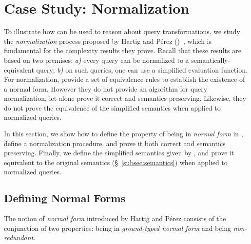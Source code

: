 \section{Case Study: Normalization}\label{sec:norm}

To illustrate how \gcoql can be used to reason about query transformations, we study the {\em normalization} process proposed by Hartig and Pérez (\HP)~\cite{gqlph}, which is fundamental for the complexity results they prove.
%
Recall that these results are based on two premises: {\em a)} every query can be normalized to a semantically-equivalent query; {\em b)} on such queries, one can use a simplified evaluation function. For normalization,  \HP provide a set of equivalence rules to establish the existence of a normal form. However they do not provide an algorithm for query normalization, let alone prove it correct and semantics preserving. Likewise, they do not prove the equivalence of the simplified semantics when applied to normalized queries.

In this section, we show how to define the property of being in \textit{normal form} in \gcoql, define a normalization procedure, and prove it both correct and semantics preserving. Finally, we define the simplified semantics given by \HP, and prove it equivalent to the original semantics (\S~\ref{subsec:semantics}) when applied to normalized queries.


\subsection{Defining Normal Forms}

The notion of \textit{normal form} introduced by Hartig and Pérez consists of the conjunction of two properties: being in \textit{ground-typed normal form} and being \textit{non-redundant}.

